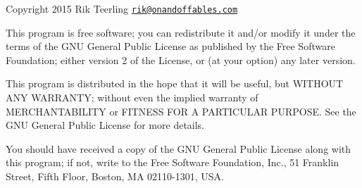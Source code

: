 Copyright 2015 Rik Teerling \href{mailto:rik@onandoffables.com}{\tt rik@onandoffables.\+com}

This program is free software; you can redistribute it and/or modify it under the terms of the G\+NU General Public License as published by the Free Software Foundation; either version 2 of the License, or (at your option) any later version.

This program is distributed in the hope that it will be useful, but W\+I\+T\+H\+O\+UT A\+NY W\+A\+R\+R\+A\+N\+TY; without even the implied warranty of M\+E\+R\+C\+H\+A\+N\+T\+A\+B\+I\+L\+I\+TY or F\+I\+T\+N\+E\+SS F\+OR A P\+A\+R\+T\+I\+C\+U\+L\+AR P\+U\+R\+P\+O\+SE. See the G\+NU General Public License for more details.

You should have received a copy of the G\+NU General Public License along with this program; if not, write to the Free Software Foundation, Inc., 51 Franklin Street, Fifth Floor, Boston, MA 02110-\/1301, U\+SA. 